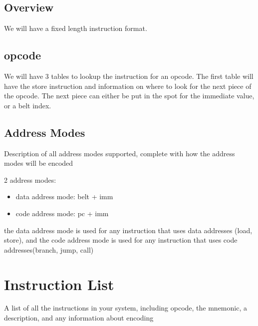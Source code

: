 \documentclass{article}
\begin{document}




\subsection{Overview}
We will have a fixed length instruction format.
\subsection{opcode}
We will have 3 tables to lookup the instruction for an opcode.
The first table will have the store instruction and information on where to look for the next piece of the opcode.
The next piece can either be put in the spot for the immediate value, or a belt index.


\subsection{Address Modes}
Description of all address modes supported, complete with how the address modes will be encoded

2 address modes:
\begin{itemize}
    \item data address mode: belt + imm
    \item code address mode: pc + imm
\end{itemize}
the data address mode is used for any instruction that uses data addresses (load, store), and the code address mode is used for any instruction that uses code addresses(branch, jump, call)

\section{Instruction List}
A list of all the instructions in your system, including opcode, the mnemonic, a description, and any information about encoding
\end{document}
